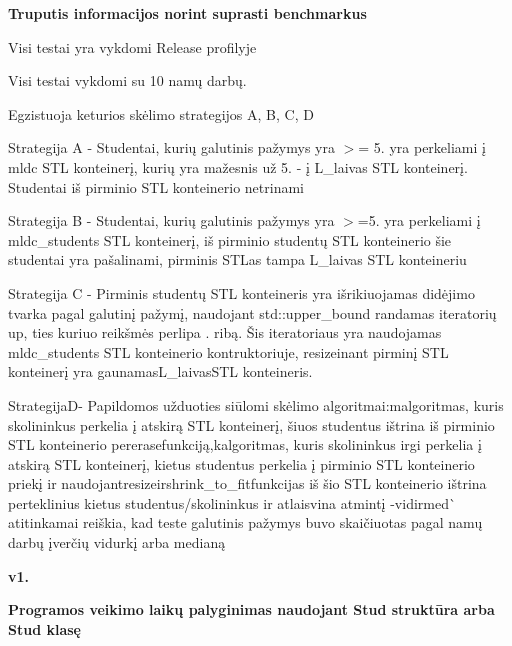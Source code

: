 {\bfseries{Truputis informacijos norint suprasti benchmarkus}}
\begin{DoxyItemize}
\item Visi testai yra vykdomi Release profilyje
\item Visi testai vykdomi su 10 namų darbų.
\item Egzistuoja keturios skėlimo strategijos {\ttfamily A, B, C, D}
\item Strategija {\ttfamily A} -\/ Studentai, kurių galutinis pažymys yra $>$= 5. yra perkeliami į {\ttfamily mldc} S\+TL konteinerį, kurių yra mažesnis už 5. -\/ į {\ttfamily L\+\_\+laivas} S\+TL konteinerį. Studentai iš pirminio S\+TL konteinerio netrinami
\item Strategija {\ttfamily B} -\/ Studentai, kurių galutinis pažymys yra $>$=5. yra perkeliami į {\ttfamily mldc\+\_\+students} S\+TL konteinerį, iš pirminio studentų S\+TL konteinerio šie studentai yra pašalinami, pirminis S\+TL\textquotesingle{}as tampa {\ttfamily L\+\_\+laivas} S\+TL konteineriu
\item Strategija {\ttfamily C} -\/ Pirminis studentų S\+TL konteineris yra išrikiuojamas didėjimo tvarka pagal galutinį pažymį, naudojant {\ttfamily std\+::upper\+\_\+bound} randamas iteratorių {\ttfamily up}, ties kuriuo reikšmės perlipa {.} ribą. Šis iteratoriaus yra naudojamas {\ttfamily mldc\+\_\+students} S\+TL konteinerio kontruktoriuje, resize{\ttfamily inant pirminį S\+TL konteinerį yra gaunamas}{\ttfamily L\+\_\+laivas}{\ttfamily S\+TL konteineris.}
\item {\ttfamily Strategija}{\ttfamily D}{\ttfamily -\/ Papildomos užduoties siūlomi skėlimo algoritmai\+:}{\ttfamily m}{\ttfamily algoritmas, kuris skolininkus perkelia į atskirą S\+TL konteinerį, šiuos studentus ištrina iš pirminio S\+TL konteinerio per}{\ttfamily erase}{\ttfamily funkciją,}{\ttfamily k}{\ttfamily algoritmas, kuris skolininkus irgi perkelia į atskirą S\+TL konteinerį, kietus studentus perkelia į pirminio S\+TL konteinerio priekį ir naudojant}{\ttfamily resize}{\ttfamily ir}{\ttfamily shrink\+\_\+to\+\_\+fit}{\ttfamily funkcijas iš šio S\+TL konteinerio ištrina perteklinius kietus studentus/skolininkus ir atlaisvina atmintį -\/}{\ttfamily vid}{\ttfamily ir}{\ttfamily med}\`{} atitinkamai reiškia, kad teste galutinis pažymys buvo skaičiuotas pagal namų darbų įverčių vidurkį arba medianą
\end{DoxyItemize}

{\bfseries{v1.}}

{\bfseries{Programos veikimo laikų palyginimas naudojant {\ttfamily Stud} struktūra arba {\ttfamily Stud} klasę}}


